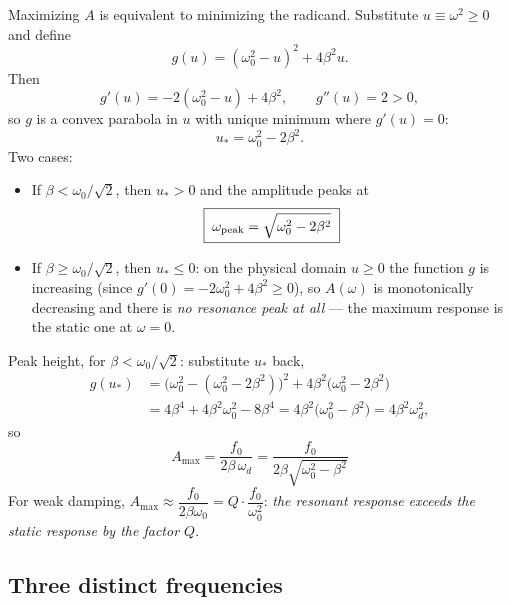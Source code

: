 \documentclass[11pt]{article}
\theoremstyle{plain}
\theoremstyle{definition}
\theoremstyle{remark}
\begin{document}
Maximizing $A$ is equivalent to minimizing the radicand. Substitute
$u \equiv \omega^2 \ge 0$ and define
\begin{equation}
  g(u) = (\omega_0^2 - u)^2 + 4\beta^2 u .
\end{equation}
Then
\begin{equation}
  g'(u) = -2(\omega_0^2 - u) + 4\beta^2,
  \qquad
  g''(u) = 2 > 0,
\end{equation}
so $g$ is a convex parabola in $u$ with unique minimum where $g'(u)=0$:
\begin{equation}
  u_\ast = \omega_0^2 - 2\beta^2 .
\end{equation}
Two cases:
\begin{itemize}
  \item If $\beta < \omega_0/\sqrt2$, then $u_\ast>0$ and the amplitude peaks
  at
  \begin{equation}
    \boxed{\;
    \omega_{\rm peak} = \sqrt{\omega_0^2 - 2\beta^2}
    \;}
  \end{equation}
  \item If $\beta \ge \omega_0/\sqrt2$, then $u_\ast \le 0$: on the physical
  domain $u\ge 0$ the function $g$ is increasing (since
  $g'(0) = -2\omega_0^2 + 4\beta^2 \ge 0$), so $A(\omega)$ is monotonically
  decreasing and there is \emph{no resonance peak at all} --- the maximum
  response is the static one at $\omega=0$.
\end{itemize}
Peak height, for $\beta<\omega_0/\sqrt2$: substitute $u_\ast$ back,
\begin{align}
  g(u_\ast) &= \bigl(\omega_0^2 - (\omega_0^2 - 2\beta^2)\bigr)^2
             + 4\beta^2\bigl(\omega_0^2 - 2\beta^2\bigr) \nonumber\\
  &= 4\beta^4 + 4\beta^2\omega_0^2 - 8\beta^4
   = 4\beta^2\bigl(\omega_0^2 - \beta^2\bigr) = 4\beta^2 \omega_d^2,
\end{align}
so
\begin{equation}
  \boxed{\;
  A_{\max} = \frac{f_0}{2\beta\,\omega_d}
  = \frac{f_0}{2\beta\sqrt{\omega_0^2-\beta^2}}
  \;}
\end{equation}
For weak damping,
$A_{\max} \approx \dfrac{f_0}{2\beta\omega_0} = Q\cdot\dfrac{f_0}{\omega_0^2}$:
\emph{the resonant response exceeds the static response by the factor $Q$}.

\subsection{Three distinct frequencies}
\end{document}

